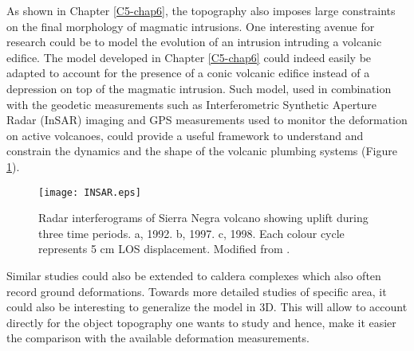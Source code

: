 As shown in Chapter \ref{C5-chap6},  the topography also imposes large
constraints  on  the final  morphology  of  magmatic intrusions.   One
interesting avenue for research could be  to model the evolution of an
intrusion  intruding  a  volcanic  edifice.  The  model  developed  in
Chapter \ref{C5-chap6} could  indeed easily be adapted  to account for
the presence  of a conic volcanic  edifice instead of a  depression on
top of the  magmatic intrusion.  Such model, used  in combination with
the geodetic  measurements such as Interferometric  Synthetic Aperture
Radar  (InSAR)  imaging  and  GPS measurements  used  to  monitor  the
deformation on active  volcanoes, could provide a  useful framework to
understand and  constrain the dynamics  and the shape of  the volcanic
plumbing systems (Figure \ref{C7-Volcano}).
\begin{figure}[h!]
  \begin{center}
    \graphicspath{ {/Users/thorey/Documents/These/Manuscript/Figure/Chapter7/} }
    \texttt{[image: INSAR.eps]}
    \caption{Radar  interferograms  of  Sierra Negra  volcano  showing
      uplift during  three time periods.   a, 1992. b, 1997.  c, 1998.
      Each colour cycle represents 5 cm LOS displacement. Modified
      from \citet{Amelung:2000ko}.}
    \label{C7-Volcano}
  \end{center}
\end{figure}

Similar studies could also be extended to caldera complexes which also
often record  ground deformations.   Towards more detailed  studies of
specific area, it could also be interesting to generalize the model in
$3$D. This  will allow to  account directly for the  object topography
one wants to  study and hence, make it easier  the comparison with the
available deformation measurements.


